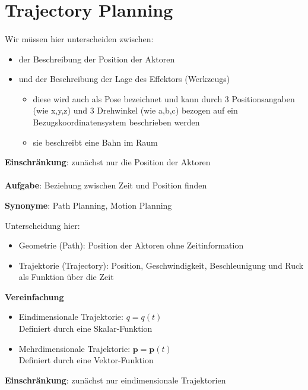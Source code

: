 \section{Trajectory Planning}

\STANDARD{\insertsection}
{ 
  \framesubtitle{\insertsubsection}

  \begin{figure}[!h]
    \centering
    
  \end{figure}

  Wir müssen hier unterscheiden zwischen:

  \begin{itemize}
    \item der Beschreibung der Position der Aktoren
    \item und der Beschreibung der Lage des Effektors (Werkzeugs)
      \begin{itemize}
        \item diese wird auch als Pose bezeichnet und kann durch 3 Positionsangaben (wie x,y,z) und 3 Drehwinkel (wie a,b,c) bezogen auf ein Bezugskoordinatensystem beschrieben werden
        \item sie beschreibt eine Bahn im Raum
      \end{itemize}
  \end{itemize}

  \textbf{Einschränkung}: zunächst nur die Position der Aktoren
}


\STANDARD{\insertsection}
{ 
  \framesubtitle{\insertsubsection}

  \textbf{Aufgabe}: Beziehung zwischen Zeit und Position finden

  \textbf{Synonyme}: Path Planning, Motion Planning

  Unterscheidung hier:

  \begin{itemize}
    \item Geometrie (Path): Position der Aktoren ohne Zeitinformation
    \item Trajektorie (Trajectory): Position, Geschwindigkeit, Beschleunigung und Ruck als Funktion über die Zeit
  \end{itemize}

\textbf{Vereinfachung}

  \begin{itemize}
    \item Eindimensionale Trajektorie: $q=q(t)$
          \\Definiert durch eine Skalar-Funktion
    \item Mehrdimensionale Trajektorie: $\textbf{p}=\textbf{p}(t)$
          \\Definiert durch eine Vektor-Funktion
  \end{itemize}

  \textbf{Einschränkung}: zunächst nur eindimensionale Trajektorien
}

